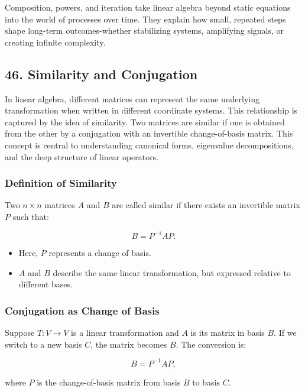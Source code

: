 \documentclass[
  letterpaper,
  DIV=11,
  numbers=noendperiod]{scrreprt}
\providecommand{\tightlist}{%
  \setlength{\itemsep}{0pt}\setlength{\parskip}{0pt}}
\begin{document}
Composition, powers, and iteration take linear algebra beyond static
equations into the world of processes over time. They explain how small,
repeated steps shape long-term outcomes-whether stabilizing systems,
amplifying signals, or creating infinite complexity.

\subsection{46. Similarity and
Conjugation}\label{similarity-and-conjugation}

In linear algebra, different matrices can represent the same underlying
transformation when written in different coordinate systems. This
relationship is captured by the idea of similarity. Two matrices are
similar if one is obtained from the other by a conjugation with an
invertible change-of-basis matrix. This concept is central to
understanding canonical forms, eigenvalue decompositions, and the deep
structure of linear operators.

\subsubsection{Definition of Similarity}\label{definition-of-similarity}

Two \(n \times n\) matrices \(A\) and \(B\) are called similar if there
exists an invertible matrix \(P\) such that:

\[
B = P^{-1}AP.
\]

\begin{itemize}
\tightlist
\item
  Here, \(P\) represents a change of basis.
\item
  \(A\) and \(B\) describe the same linear transformation, but expressed
  relative to different bases.
\end{itemize}

\subsubsection{Conjugation as Change of
Basis}\label{conjugation-as-change-of-basis}

Suppose \(T: V \to V\) is a linear transformation and \(A\) is its
matrix in basis \(B\). If we switch to a new basis \(C\), the matrix
becomes \(B\). The conversion is:

\[
B = P^{-1}AP,
\]

where \(P\) is the change-of-basis matrix from basis \(B\) to basis
\(C\).
\end{document}
